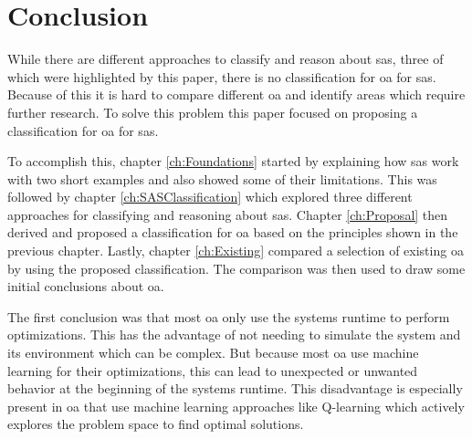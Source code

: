 \section{Conclusion}
\label{ch:Conclusion}





While there are different approaches to classify and reason about \acrshort{sas}, three of which were highlighted by this paper,
there is no classification for \acrshort{oa} for \acrshort{sas}.
Because of this it is hard to compare different \acrshort{oa} and identify areas which require further research.
To solve this problem this paper focused on proposing a classification for \acrshort{oa} for \acrshort{sas}.

\noindent To accomplish this, chapter \ref{ch:Foundations} started by explaining how \acrshort{sas} work with two short examples
and also showed some of their limitations.
This was followed by chapter \ref{ch:SASClassification} which explored three different approaches
for classifying and reasoning about \acrshort{sas}.
Chapter \ref{ch:Proposal} then derived and proposed a classification for \acrshort{oa} based on the principles shown in the previous chapter.
Lastly, chapter \ref{ch:Existing} compared a selection of existing \acrshort{oa} by using the proposed classification.
The comparison was then used to draw some initial conclusions about \acrshort{oa}.

\noindent The first conclusion was that most \acrshort{oa} only use the systems runtime to perform optimizations.
This has the advantage of not needing to simulate the system and its environment which can be complex.
But because most \acrshort{oa} use machine learning for their optimizations,
this can lead to unexpected or unwanted behavior at the beginning of the systems runtime.
This disadvantage is especially present in \acrshort{oa} that use machine learning approaches
like Q-learning which actively explores the problem space to find optimal solutions.

